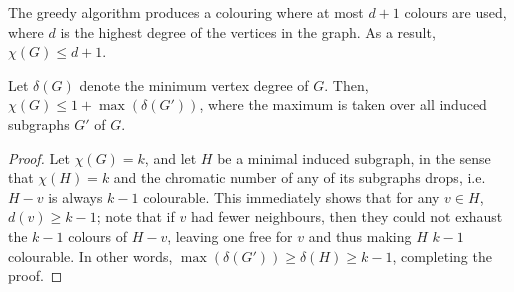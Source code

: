 \documentclass[11pt]{article}
\theoremstyle{definition}
\theoremstyle{remark}
\numberwithin{equation}{section}
\begin{document}
    \begin{lemma}
        The greedy algorithm produces a colouring where at most $d + 1$ colours are
        used, where $d$ is the highest degree of the vertices in the graph. As a
        result, $\chi(G) \leq d + 1$.
    \end{lemma}

    \begin{theorem}
        Let $\delta(G)$ denote the minimum vertex degree of $G$. Then, $\chi(G) \leq
        1 + \max(\delta(G'))$, where the maximum is taken over all induced subgraphs
        $G'$ of $G$.
    \end{theorem}
    \begin{proof}
        Let $\chi(G) = k$, and let $H$ be a minimal induced subgraph, in the sense
        that $\chi(H) = k$ and the chromatic number of any of its subgraphs drops,
        i.e.\ $H - v$ is always $k - 1$ colourable. This immediately shows that for
        any $v \in H$, $d(v) \geq k - 1$; note that if $v$ had fewer neighbours, then
        they could not exhaust the $k - 1$ colours of $H - v$, leaving one free for
        $v$ and thus making $H$ $k - 1$ colourable. In other words, $\max(\delta(G'))
        \geq \delta(H) \geq k - 1$, completing the proof.
    \end{proof}
    
\end{document}
